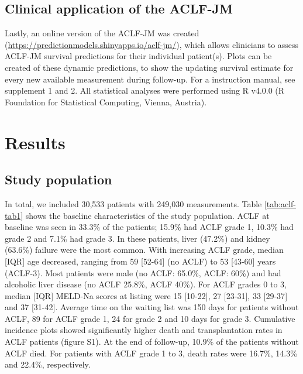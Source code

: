 \documentclass[11pt,english,]{book} %
\begin{document}
\hypertarget{clinical-application-of-the-aclf-jm}{%
\subsection*{Clinical application of the ACLF-JM}\label{clinical-application-of-the-aclf-jm}}

Lastly, an online version of the ACLF-JM was created (\url{https://predictionmodels.shinyapps.io/aclf-jm/}), which allows clinicians to assess ACLF-JM survival predictions for their individual patient(s). Plots can be created of these dynamic predictions, to show the updating survival estimate for every new available measurement during follow-up. For a instruction manual, see supplement 1 and 2. All statistical analyses were performed using R v4.0.0 (R Foundation for Statistical Computing, Vienna, Austria).

\hypertarget{results-3}{%
\section*{Results}\label{results-3}}

\hypertarget{study-population-3}{%
\subsection*{Study population}\label{study-population-3}}

In total, we included 30,533 patients with 249,030 measurements. Table \ref{tab:aclf-tab1} shows the baseline characteristics of the study population. ACLF at baseline was seen in 33.3\% of the patients; 15.9\% had ACLF grade 1, 10.3\% had grade 2 and 7.1\% had grade 3. In these patients, liver (47.2\%) and kidney (63.6\%) failure were the most common. With increasing ACLF grade, median {[}IQR{]} age decreased, ranging from 59 {[}52-64{]} (no ACLF) to 53 {[}43-60{]} years (ACLF-3). Most patients were male (no ACLF: 65.0\%, ACLF: 60\%) and had alcoholic liver disease (no ACLF 25.8\%, ACLF 40\%). For ACLF grades 0 to 3, median {[}IQR{]} MELD-Na scores at listing were 15 {[}10-22{]}, 27 {[}23-31{]}, 33 {[}29-37{]} and 37 {[}31-42{]}. Average time on the waiting list was 150 days for patients without ACLF, 89 for ACLF grade 1, 24 for grade 2 and 10 days for grade 3. Cumulative incidence plots showed significantly higher death and transplantation rates in ACLF patients (figure S1). At the end of follow-up, 10.9\% of the patients without ACLF died. For patients with ACLF grade 1 to 3, death rates were 16.7\%, 14.3\% and 22.4\%, respectively.
\end{document}
